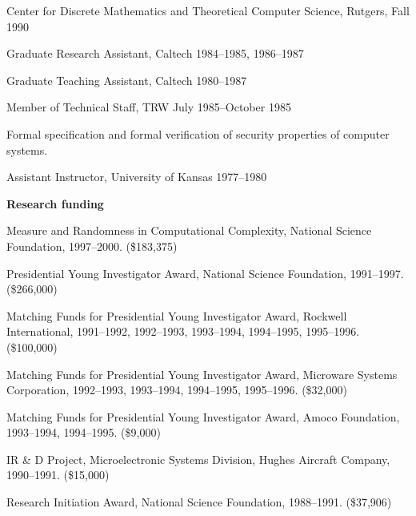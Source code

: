 \hangindent=0.3in
Center for Discrete Mathematics and Theoretical Computer Science, Rutgers,
Fall
1990

\vspace*{\medskipamount}
Graduate Research Assistant, Caltech 1984--1985, 1986--1987

\vspace*{\medskipamount}
Graduate Teaching Assistant, Caltech 1980--1987

\vspace*{\medskipamount}
Member of Technical Staff, TRW July 1985--October 1985

\hangindent=0.3in
Formal specification and formal verification of security properties of
computer systems.

\vspace*{\medskipamount}
Assistant Instructor, University of Kansas 1977--1980

\vspace*{\bigskipamount}
{\bf Research funding}

\vspace*{\smallskipamount}
Measure and Randomness in Computational Complexity, National
Science Foundation, 1997--2000.  (\$183,375)

\vspace*{\smallskipamount}
Presidential Young Investigator Award, National Science Foundation,
1991--1997.  (\$266,000)

\vspace*{\smallskipamount}
Matching Funds for Presidential Young Investigator Award, Rockwell International,
1991--1992, 1992--1993, 1993--1994, 1994--1995, 1995--1996.  (\$100,000)

\vspace*{\smallskipamount}
Matching Funds for Presidential Young Investigator Award, Microware
Systems Corporation, 1992--1993, 1993--1994, 1994--1995,
1995--1996.  (\$32,000)

\vspace*{\smallskipamount}
Matching Funds for Presidential Young Investigator Award, Amoco
Foundation, 1993--1994, 1994--1995.  (\$9,000)

\vspace*{\medskipamount}
IR \& D Project, Microelectronic Systems Division, Hughes Aircraft Company,
1990--1991.  (\$15,000)

\vspace*{\medskipamount}
Research Initiation Award, National Science Foundation, 1988--1991.  (\$37,906)

